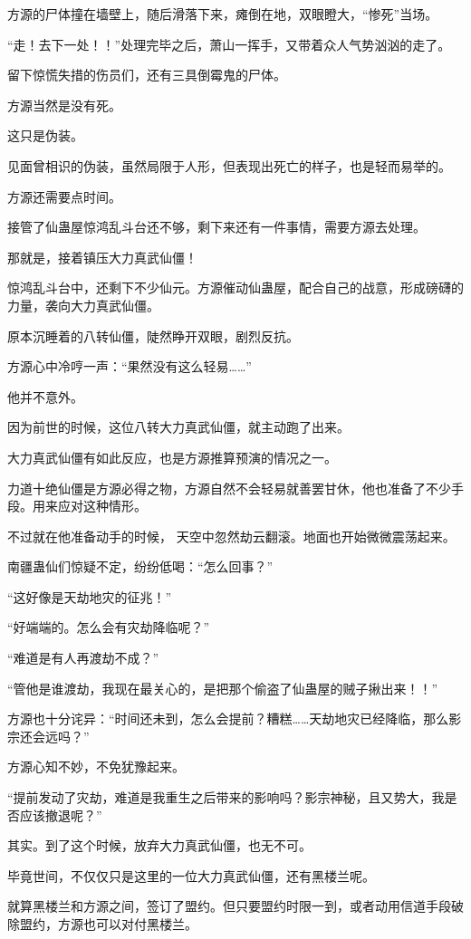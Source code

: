 \begin{this_body}
方源的尸体撞在墙壁上，随后滑落下来，瘫倒在地，双眼瞪大，“惨死”当场。

“走！去下一处！！”处理完毕之后，萧山一挥手，又带着众人气势汹汹的走了。

留下惊慌失措的伤员们，还有三具倒霉鬼的尸体。

方源当然是没有死。

这只是伪装。

见面曾相识的伪装，虽然局限于人形，但表现出死亡的样子，也是轻而易举的。

方源还需要点时间。

接管了仙蛊屋惊鸿乱斗台还不够，剩下来还有一件事情，需要方源去处理。

那就是，接着镇压大力真武仙僵！

惊鸿乱斗台中，还剩下不少仙元。方源催动仙蛊屋，配合自己的战意，形成磅礴的力量，袭向大力真武仙僵。

原本沉睡着的八转仙僵，陡然睁开双眼，剧烈反抗。

方源心中冷哼一声：“果然没有这么轻易……”

他并不意外。

因为前世的时候，这位八转大力真武仙僵，就主动跑了出来。

大力真武仙僵有如此反应，也是方源推算预演的情况之一。

力道十绝仙僵是方源必得之物，方源自然不会轻易就善罢甘休，他也准备了不少手段。用来应对这种情形。

不过就在他准备动手的时候， 天空中忽然劫云翻滚。地面也开始微微震荡起来。

南疆蛊仙们惊疑不定，纷纷低喝：“怎么回事？”

“这好像是天劫地灾的征兆！”

“好端端的。怎么会有灾劫降临呢？”

“难道是有人再渡劫不成？”

“管他是谁渡劫，我现在最关心的，是把那个偷盗了仙蛊屋的贼子揪出来！！”

方源也十分诧异：“时间还未到，怎么会提前？糟糕……天劫地灾已经降临，那么影宗还会远吗？”

方源心知不妙，不免犹豫起来。

“提前发动了灾劫，难道是我重生之后带来的影响吗？影宗神秘，且又势大，我是否应该撤退呢？”

其实。到了这个时候，放弃大力真武仙僵，也无不可。

毕竟世间，不仅仅只是这里的一位大力真武仙僵，还有黑楼兰呢。

就算黑楼兰和方源之间，签订了盟约。但只要盟约时限一到，或者动用信道手段破除盟约，方源也可以对付黑楼兰。


\end{this_body}
